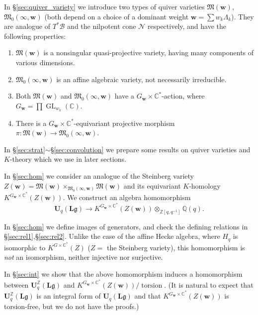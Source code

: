 \documentclass[12pt]{amsart}
\def\Bbb{\mathbb}
\def\frak{\mathfrak}
\theoremstyle{definition}
\theoremstyle{remark}
\numberwithin{equation}{subsection}
\newcommand{\secref}[1]{\S\ref{#1}}
\newcommand{\C}{{\Bbb C}}
\newcommand{\Z}{{\Bbb Z}}
\newcommand{\Q}{{\Bbb Q}}
\newcommand{\GL}{\operatorname{GL}}
\newcommand{\M}{{\frak M}} %
\newcommand{\bw}{{\mathbf w}} %
\newcommand{\Ul}{{\mathbf U}_q({\mathbf L}{\mathfrak g})} %
\newcommand{\Uli}{{\mathbf U}^{\Z}_q({\mathbf L}\mathfrak g)}
\newcommand{\Zw}{Z(\bw)}
\newcommand{\Mw}{\M(\bw)}
\begin{document}
In \secref{sec:quiver_variety} we introduce two types of quiver
varieties $\Mw$, $\M_0(\infty,\bw)$ (both depend on a choice of a
dominant weight $\bw = \sum w_k \Lambda_k$). They are analogue of
$T^*\mathcal B$ and the nilpotent cone $\mathcal N$ respectively, and
have the following properties:
\begin{enumerate}
\item $\Mw$ is a nonsingular quasi-projective variety, having many 
components of various dimensions.
\item $\M_0(\infty,\bw)$ is an affine algebraic variety, not necessarily
irreducible.
\item Both $\Mw$ and $\M_0(\infty,\bw)$ have a
$G_\bw\times\C^*$-action, where $G_\bw = \prod \GL_{w_k}(\C)$.
\item There is a $G_\bw\times\C^*$-equivariant projective
morphism $\pi\colon\Mw\to \M_0(\infty,\bw)$.
\end{enumerate}

In \secref{sec:strat}$\sim$\secref{sec:convolution} we prepare some
results on quiver varieties and $K$-theory which we use in later
sections.

In \secref{sec:hom} we consider an analogue of the Steinberg variety
$\Zw = \M(\bw)\times_{\M_0(\infty,\bw)}\M(\bw)$ and its equivariant
$K$-homology $K^{G_\bw\times\C^*}(\Zw)$.
%
We construct an algebra homomorphism 
\[ 
   \Ul\to K^{G_\bw\times\C^*}(\Zw)\otimes_{\Z[q,q^{-1}]}\Q(q).
\]

In \secref{sec:hom} we define images of generators, and check the
defining relations in \secref{sec:rel1},\secref{sec:rel2}. Unlike the
case of the affine Hecke algebra, where $H_q$ is isomorphic to
$K^{G\times\C^*}(Z)$ ($Z =$ the Steinberg variety), this homomorphism
is {\it not\/} an isomorphism, neither injective nor surjective.

In \secref{sec:int} we show that the above homomorphism induces a
homomorphism between $\Uli$ and
$K^{G_\bw\times\C^*}(\Zw)/\!\operatorname{torsion}$.
%
(It is natural to expect that $\Uli$ is an integral form of $\Ul$ and
that $K^{G_\bw\times\C^*}(\Zw)$ is torsion-free, but we do not have
the proofs.)
\end{document}
